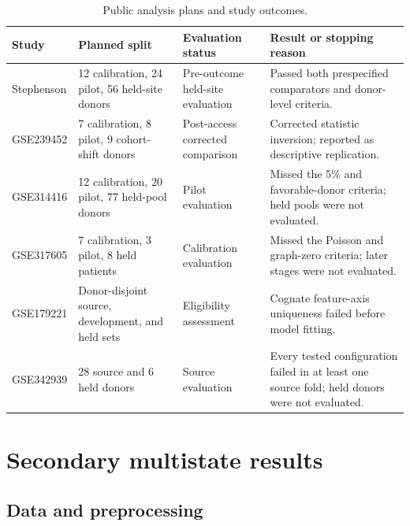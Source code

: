 \documentclass[10pt,a4paper]{article}
\begin{document}
\begin{table}[H]
\centering
\caption{Public analysis plans and study outcomes.}
\label{tab:s-public-sequence}
\footnotesize
\setlength{\tabcolsep}{4pt}
\begin{tabularx}{\textwidth}{@{}P{2.0cm} P{3.2cm} P{3.3cm} Y@{}}
\toprule
Study & Planned split & Evaluation status & Result or stopping reason \\
\midrule
Stephenson & 12 calibration, 24 pilot, 56 held-site donors & Pre-outcome held-site evaluation & Passed both prespecified comparators and donor-level criteria. \\
GSE239452 & 7 calibration, 8 pilot, 9 cohort-shift donors & Post-access corrected comparison & Corrected statistic inversion; reported as descriptive replication. \\
GSE314416 & 12 calibration, 20 pilot, 77 held-pool donors & Pilot evaluation & Missed the 5\% and favorable-donor criteria; held pools were not evaluated. \\
GSE317605 & 7 calibration, 3 pilot, 8 held patients & Calibration evaluation & Missed the Poisson and graph-zero criteria; later stages were not evaluated. \\
GSE179221 & Donor-disjoint source, development, and held sets & Eligibility assessment & Cognate feature-axis uniqueness failed before model fitting. \\
GSE342939 & 28 source and 6 held donors & Source evaluation & Every tested configuration failed in at least one source fold; held donors were not evaluated. \\
\bottomrule
\end{tabularx}
\end{table}

\section{Secondary multistate results}

\subsection{Data and preprocessing}
\end{document}
